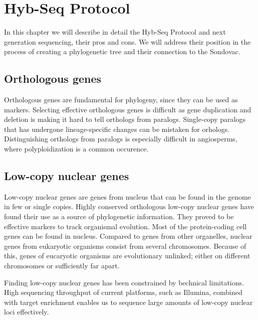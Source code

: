 \chapter[Hyb-Seq Protocol]{Hyb-Seq Protocol}
\label{kap:hyb_seq}

In this chapter we will describe in detail the Hyb-Seq Protocol and next generation sequencing, their pros 
and cons. We will address their position in the process of creating a phylogenetic tree and their connection 
to the Sondovac. 

\section{Orthologous genes}
Orthologous genes are fundamental for phylogeny, since they can be used as markers. Selecting effective orthologous genes 
is difficult as gene duplication and deletion is making it hard to tell orthologs from paralogs. Single-copy paralogs that has 
undergone lineage-specific changes can be mistaken for orhologs. 
Distinguishing orthologs from paralogs is especially difficult in angiosperms, where polyploidization is a common occurence. 

\section{Low-copy nuclear genes}
Low-copy nuclear genes are genes from nucleus that can be found in the genome in few or single copies. 
Highly conserved orthologous low-copy nuclear genes have found their use as a source of phylogenetic information. They proved to be effective markers to 
track organismal evolution. 
Most of the protein-coding cell genes can be found in nucleus. Compared to genes from other organelles, nuclear genes from eukaryotic organisms consist 
from several chromosomes. Because of this, genes of eucaryotic organisms are evolutionary unlinked; either on different chromosomes or sufficiently far apart. 

Finding low-copy nuclear genes has been constrained by bechnical limitations. High sequencing throughput of current platforms, such as Illumina, combined with 
target enrichment enables us to sequence large amounts of low-copy nuclear loci effectively. 

